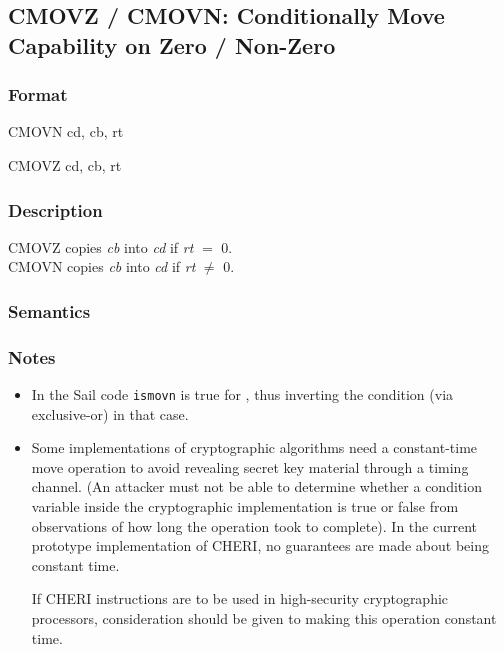 \clearpage
{}
{}
\subsection*{CMOVZ / CMOVN: Conditionally Move Capability on Zero / Non-Zero}

\subsubsection*{Format}

CMOVN cd, cb, rt

\begin{center}
\end{center}

{}
CMOVZ cd, cb, rt

\begin{center}
\end{center}

\subsubsection*{Description}

CMOVZ copies \emph{cb} into \emph{cd} if \emph{rt} $=$ 0. \\
CMOVN copies \emph{cb} into \emph{cd} if \emph{rt} $\neq$ 0. \\

\subsubsection*{Semantics}


\subsubsection*{Notes}

\begin{itemize}
\item
In the Sail code {\tt ismovn} is true for , thus inverting the condition (via exclusive-or) in that case.
\item
Some implementations of cryptographic algorithms need a constant-time move
operation to avoid revealing secret key material through a timing channel.
(An attacker must not be able to determine whether a condition variable
inside the cryptographic implementation is true or false from observations
of how long the operation took to complete). In the current prototype
implementation of CHERI, no guarantees are made about 
being constant time.

If CHERI instructions are to be used in high-security cryptographic
processors, consideration should be given to making this operation
constant time.
\end{itemize}
